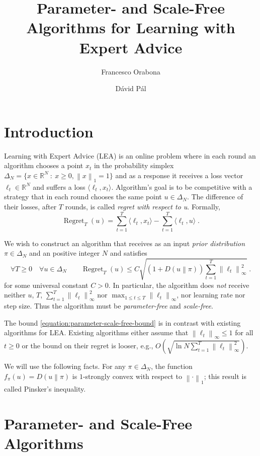 \documentclass[12pt]{article}
\newcommand{\R}{\mathbb{R}}
\newcommand{\norm}[1]{\left\|#1\right\|}
\newcommand{\KL}[2]{D\left(#1 \middle\| #2 \right)}
\DeclareMathOperator{\Regret}{Regret}
\begin{document}
\title{Parameter- and Scale-Free Algorithms for Learning with Expert Advice}
\author{Francesco Orabona \and D\'avid P\'al}
\maketitle

\section{Introduction}

Learning with Expert Advice (LEA) is an online problem where in each round an
algorithm chooses a point $x_t$ in the probability simplex $\Delta_N = \{x \in
\R^N ~:~ x \ge 0, \norm{x}_1 = 1 \}$ and as a response it receives a loss
vector $\ell_t \in \R^N$ and suffers a loss $\langle \ell_t, x_t \rangle$.
Algorithm's goal is to be competitive with a strategy that in each round
chooses the same point $u \in \Delta_N$.
The difference of their losses, after $T$ rounds, is called
\emph{regret with respect to u}. Formally,
$$
\Regret_T(u) = \sum_{t=1}^T \langle \ell_t, x_t \rangle - \sum_{t=1}^T \langle \ell_t, u \rangle \; .
$$

We wish to construct an algorithm that receives as an input \emph{prior
distribution} $\pi \in \Delta_N$ and an positive integer $N$ and satisfies
\begin{equation}
\label{equation:parameter-scale-free-bound}
\forall T \ge 0 \quad \forall u \in \Delta_N \qquad \Regret_T(u) \le C \sqrt{(1 + \KL{u}{\pi}) \sum_{t=1}^T \norm{\ell_t}_\infty^2} \; .
\end{equation}
for some universal constant $C > 0$.  In particular, the algorithm does
\emph{not} receive neither $u$, $T$, $\sum_{t=1}^T \norm{\ell_t}_\infty^2$ nor
$\max_{1 \le t \le T} \norm{\ell_t}_\infty$, nor learning rate nor step size.
Thus the algorithm must be \emph{parameter-free} and \emph{scale-free}.

The bound \eqref{equation:parameter-scale-free-bound} is in contrast with
existing algorithms for LEA. Existing algorithms either assume that
$\norm{\ell_t}_\infty \le 1$ for all $t \ge 0$ or the bound on their regret is
looser, e.g., $O\left( \sqrt{\ln N \sum_{t=1}^T \norm{\ell_t}_\infty^2}
\right)$.

We will use the following facts. For any $\pi \in \Delta_N$, the function
$f_\pi(u) = \KL{u}{\pi}$ is $1$-strongly convex with respect to
$\norm{\cdot}_1$; this result is called Pinsker's inequality.

\section{Parameter- and Scale-Free Algorithms}
\end{document}
